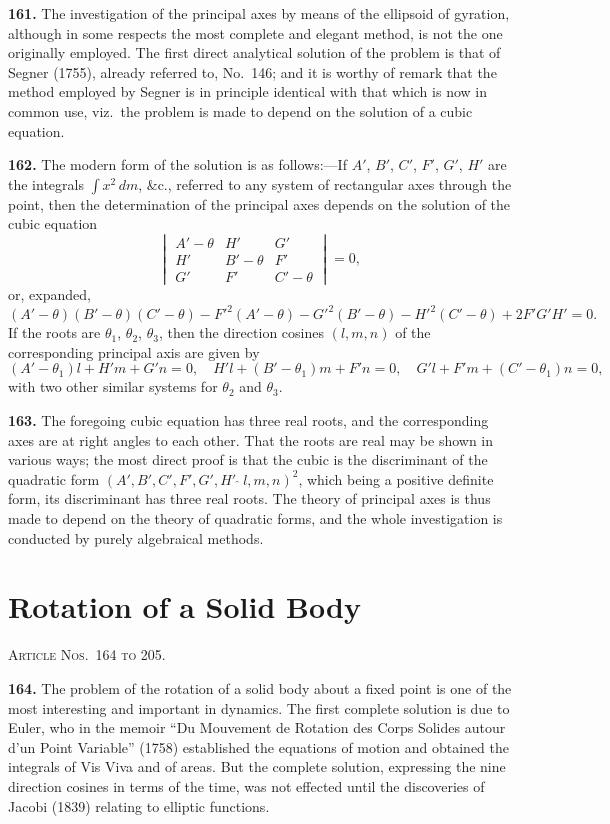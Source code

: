 \documentclass[11pt,a4paper]{article}
\theoremstyle{definition}
\begin{document}
\textbf{161.} The investigation of the principal axes by means of the ellipsoid of gyration, although in some respects the most complete and elegant method, is not the one originally employed. The first direct analytical solution of the problem is that of Segner (1755), already referred to, No.~146; and it is worthy of remark that the method employed by Segner is in principle identical with that which is now in common use, viz.\ the problem is made to depend on the solution of a cubic equation.

\textbf{162.} The modern form of the solution is as follows:---If $A'$, $B'$, $C'$, $F'$, $G'$, $H'$ are the integrals $\int x^2\,dm$, \&c., referred to any system of rectangular axes through the point, then the determination of the principal axes depends on the solution of the cubic equation
\[
\begin{vmatrix}
A' - \theta & H' & G' \\
H' & B' - \theta & F' \\
G' & F' & C' - \theta
\end{vmatrix} = 0,
\]
or, expanded,
\[
(A' - \theta)(B' - \theta)(C' - \theta) - F'^2(A' - \theta) - G'^2(B' - \theta) - H'^2(C' - \theta) + 2F'G'H' = 0.
\]
If the roots are $\theta_1$, $\theta_2$, $\theta_3$, then the direction cosines $(l, m, n)$ of the corresponding principal axis are given by
\[
(A' - \theta_1)l + H'm + G'n = 0, \quad H'l + (B' - \theta_1)m + F'n = 0, \quad G'l + F'm + (C' - \theta_1)n = 0,
\]
with two other similar systems for $\theta_2$ and $\theta_3$.

\textbf{163.} The foregoing cubic equation has three real roots, and the corresponding axes are at right angles to each other. That the roots are real may be shown in various ways; the most direct proof is that the cubic is the discriminant of the quadratic form $(A', B', C', F', G', H'\,\widehat{\,}\,l, m, n)^2$, which being a positive definite form, its discriminant has three real roots. The theory of principal axes is thus made to depend on the theory of quadratic forms, and the whole investigation is conducted by purely algebraical methods.


\section*{Rotation of a Solid Body}
\noindent\textsc{Article Nos.~164 to 205.}

\medskip

\textbf{164.} The problem of the rotation of a solid body about a fixed point is one of the most interesting and important in dynamics. The first complete solution is due to Euler, who in the memoir ``Du Mouvement de Rotation des Corps Solides autour d'un Point Variable'' (1758) established the equations of motion and obtained the integrals of Vis Viva and of areas. But the complete solution, expressing the nine direction cosines in terms of the time, was not effected until the discoveries of Jacobi (1839) relating to elliptic functions.
\end{document}
